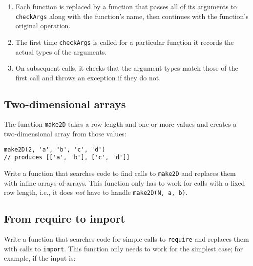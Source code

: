 \documentclass[krantzl]{krantz}
\begin{document}
\begin{enumerate}

\item 

Each function is replaced by a function that passes all of its arguments to \texttt{checkArgs}
    along with the function’s name,
    then continues with the function’s original operation.



\item 

The first time \texttt{checkArgs} is called for a particular function
    it records the actual types of the arguments.



\item 

On subsequent calls, it checks that the argument types match those of the first call
    and throws an exception if they do not.



\end{enumerate}

\subsection*{Two-dimensional arrays}


The function \texttt{make2D} takes a row length and one or more values
and creates a two-dimensional array from those values:

\begin{lstlisting}[frame=tblr]
make2D(2, 'a', 'b', 'c', 'd')
// produces [['a', 'b'], ['c', 'd']]
\end{lstlisting}


\noindent Write a function that searches code to find calls to \texttt{make2D}
and replaces them with inline arrays-of-arrays.
This function only has to work for calls with a fixed row length,
i.e., it does \emph{not} have to handle \texttt{make2D(N, {\textquotesingle}a{\textquotesingle}, {\textquotesingle}b{\textquotesingle})}.

\subsection*{From require to import}


Write a function that searches code for simple calls to \texttt{require}
and replaces them with calls to \texttt{import}.
This function only needs to work for the simplest case;
for example, if the input is:
\end{document}
